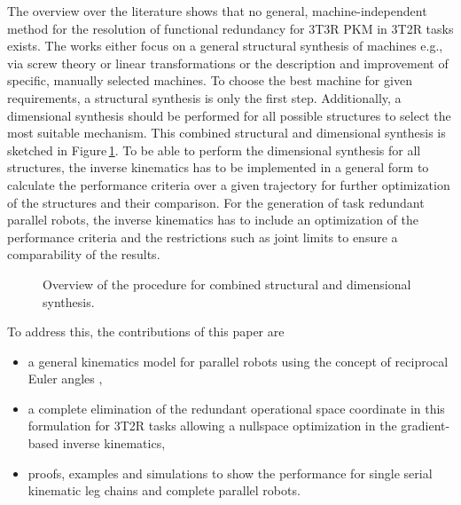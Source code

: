 \documentclass[robotics,article,accept,moreauthors,pdftex]{Definitions/mdpi}
\begin{document}
The overview over the literature shows\deleted[id=Sp]{,} that no general, machine-independent method for the resolution of functional redundancy for 3T3R PKM in 3T2R tasks exists.
The works either focus on a general structural synthesis of machines\added[id=Sp]{,} e.g., via screw theory \cite{KongGos2005} or linear transformations \cite{Gogu2006} or the description and improvement of specific, manually selected\deleted[id=Sp]{,} machines.
To choose the best machine for given requirements, a structural synthesis is only the first step.
Additionally, a dimensional synthesis should be performed for all possible structures to select the most suitable mechanism.
This combined structural and dimensional synthesis \cite{RamirezKotOrt2015} is sketched in Figure\,\ref{fig:structdimsynth}.
To be able to perform the dimensional synthesis for all structures, the inverse kinematics has to be implemented in a general form\deleted[id=Sp]{,} to calculate the performance criteria over a given trajectory for further optimization of the structures and their comparison.
For the generation of task redundant parallel robots, the inverse kinematics has to include an optimization of the performance criteria and the restrictions such as joint limits\deleted[id=Sp]{,} to ensure a comparability of the results.
%
\begin{figure}[H]
	
	\caption{Overview of the procedure for combined structural and dimensional synthesis.}
	\label{fig:structdimsynth}
\end{figure} 
%
%
To address this, the contributions of this paper are
\begin{itemize}
\item a general kinematics model for parallel robots using the concept of reciprocal Euler angles \cite{1_SchapplerTapOrt2019},
\item a complete elimination of the redundant operational space coordinate in this formulation for 3T2R tasks allowing a nullspace optimization in the gradient-based inverse kinematics,
\item proofs, examples and simulations to show the performance for single serial kinematic leg chains and complete parallel robots.
\end{itemize}
\end{document}
